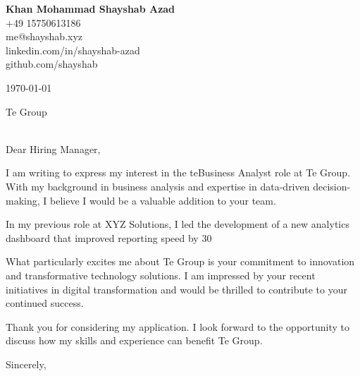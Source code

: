 \documentclass[11pt,a4paper]{letter}
\makeatletter
\renewcommand{\opening}[1]{\thispagestyle{firstpage}%
  \par\noindent{\color{accentColor}\rule{\textwidth}{1pt}}\par
  \vspace{1em}\par\noindent#1\par\vspace{1em}}
\renewcommand{\closing}[1]{\par\noindent#1\par
  \vspace{2\parskip}%
  \par\noindent\@author\par}
\makeatother
\begin{document}
\begin{flushright}
\textbf{Khan Mohammad Shayshab Azad}\\
+49 15750613186\\
me@shayshab.xyz\\
linkedin.com/in/shayshab-azad\\
github.com/shayshab
\end{flushright}

\begin{flushright}
\today
\end{flushright}

\begin{flushleft}
Te Group\\
[Company Address]\\
[City, State ZIP]
\end{flushleft}

\opening{Dear Hiring Manager,}

I am writing to express my interest in the teBusiness Analyst role at Te Group. With my background in business analysis and expertise in data-driven decision-making, I believe I would be a valuable addition to your team.

In my previous role at XYZ Solutions, I led the development of a new analytics dashboard that improved reporting speed by 30%

What particularly excites me about Te Group is your commitment to innovation and transformative technology solutions. I am impressed by your recent initiatives in digital transformation and would be thrilled to contribute to your continued success.

Thank you for considering my application. I look forward to the opportunity to discuss how my skills and experience can benefit Te Group.

\closing{Sincerely,}
\end{document}
